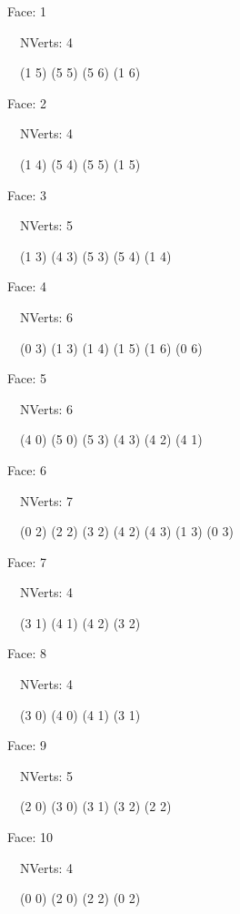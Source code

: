 \documentclass{article}
\begin{document}
{\footnotesize 

Face: 1

\   \    NVerts: 4

 \   \   (1 5) (5 5) (5 6) (1 6)}

{\footnotesize 

Face: 2

\   \    NVerts: 4

 \   \   (1 4) (5 4) (5 5) (1 5)}

{\footnotesize 

Face: 3

\   \    NVerts: 5

 \   \   (1 3) (4 3) (5 3) (5 4) (1 4)}

{\footnotesize 

Face: 4

\   \    NVerts: 6

 \   \   (0 3) (1 3) (1 4) (1 5) (1 6) (0 6)}

{\footnotesize 

Face: 5

\   \    NVerts: 6

 \   \   (4 0) (5 0) (5 3) (4 3) (4 2) (4 1)}

{\footnotesize 

Face: 6

\   \    NVerts: 7

 \   \   (0 2) (2 2) (3 2) (4 2) (4 3) (1 3) (0 3)}

{\footnotesize 

Face: 7

\   \    NVerts: 4

 \   \   (3 1) (4 1) (4 2) (3 2)}

{\footnotesize 

Face: 8

\   \    NVerts: 4

 \   \   (3 0) (4 0) (4 1) (3 1)}

{\footnotesize 

Face: 9

\   \    NVerts: 5

 \   \   (2 0) (3 0) (3 1) (3 2) (2 2)}

{\footnotesize 

Face: 10

\   \    NVerts: 4

 \   \   (0 0) (2 0) (2 2) (0 2)}


 \newpage
\end{document}
